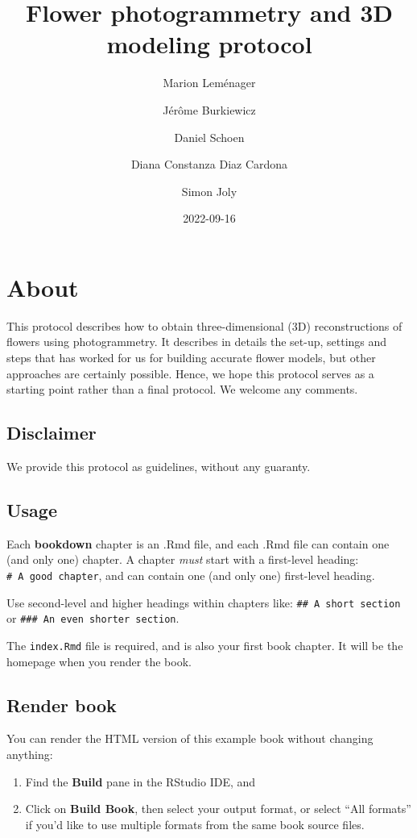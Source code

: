 \documentclass[
]{book}
\title{Flower photogrammetry and 3D modeling protocol}
\author{Marion Leménager \and Jérôme Burkiewicz \and Daniel Schoen \and Diana Constanza Diaz Cardona \and Simon Joly}
\date{2022-09-16}
\theoremstyle{definition}
\theoremstyle{definition}
\theoremstyle{definition}
\theoremstyle{definition}
\theoremstyle{remark}
\begin{document}
\maketitle

{
\setcounter{tocdepth}{1}
\tableofcontents
}
\hypertarget{about}{%
\chapter{About}\label{about}}

This protocol describes how to obtain three-dimensional (3D) reconstructions of flowers using photogrammetry. It describes in details the set-up, settings and steps that has worked for us for building accurate flower models, but other approaches are certainly possible. Hence, we hope this protocol serves as a starting point rather than a final protocol. We welcome any comments.

\hypertarget{disclaimer}{%
\section{Disclaimer}\label{disclaimer}}

We provide this protocol as guidelines, without any guaranty.

\hypertarget{usage}{%
\section{Usage}\label{usage}}

Each \textbf{bookdown} chapter is an .Rmd file, and each .Rmd file can contain one (and only one) chapter. A chapter \emph{must} start with a first-level heading: \texttt{\#\ A\ good\ chapter}, and can contain one (and only one) first-level heading.

Use second-level and higher headings within chapters like: \texttt{\#\#\ A\ short\ section} or \texttt{\#\#\#\ An\ even\ shorter\ section}.

The \texttt{index.Rmd} file is required, and is also your first book chapter. It will be the homepage when you render the book.

\hypertarget{render-book}{%
\section{Render book}\label{render-book}}

You can render the HTML version of this example book without changing anything:

\begin{enumerate}
\def\labelenumi{\arabic{enumi}.}
\item
  Find the \textbf{Build} pane in the RStudio IDE, and
\item
  Click on \textbf{Build Book}, then select your output format, or select ``All formats'' if you'd like to use multiple formats from the same book source files.
\end{enumerate}
\end{document}
